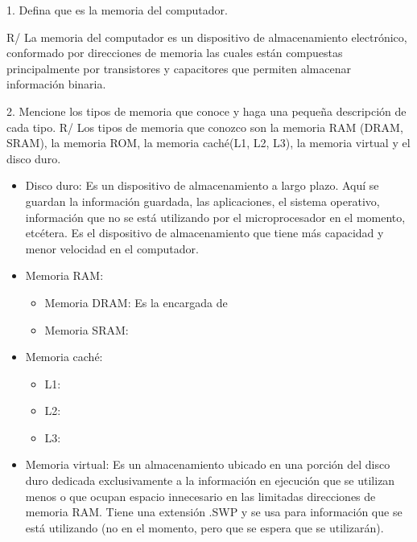 \documentclass{article}
\begin{document}
1. Defina que es la memoria del computador.

R/ La memoria del computador es un dispositivo de almacenamiento electrónico, conformado por direcciones de memoria las cuales están compuestas principalmente por transistores y capacitores que permiten almacenar información binaria.

\vspace{0.5cm}
2. Mencione los tipos de memoria que conoce y haga una pequeña descripción de cada tipo.
R/ Los tipos de memoria que conozco son la memoria RAM (DRAM, SRAM), la memoria ROM, la memoria caché(L1, L2, L3), la memoria virtual y el disco duro.

\vspace{0.5cm}

\begin{itemize}


    \item Disco duro:
    Es un dispositivo de almacenamiento a largo plazo. Aquí se guardan la información guardada, las aplicaciones, el sistema operativo, información que no se está utilizando por el microprocesador en el momento, etcétera. Es el dispositivo de almacenamiento que tiene más capacidad y menor velocidad en el computador.
    
    
    \item Memoria RAM:
    \begin{itemize}
        \item Memoria DRAM:
        Es la encargada de 
        \item Memoria SRAM:
    \end{itemize}


    \item Memoria caché:
    \begin{itemize}
        \item L1:
        \item L2: 
        \item L3:
    \end{itemize}
    


    \item Memoria virtual:
    Es un almacenamiento ubicado en una porción del disco duro dedicada exclusivamente a la información en ejecución que se utilizan menos o que ocupan espacio innecesario en las limitadas direcciones de memoria RAM.
    Tiene una extensión .SWP y se usa para información que se está utilizando (no en el momento, pero que se espera que se utilizarán).





\end{itemize}
\end{document}
